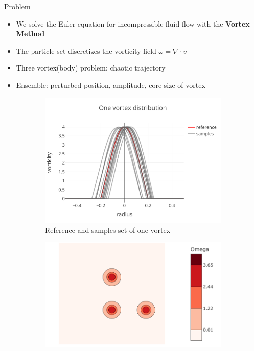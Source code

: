 \documentclass[aspectratio=169]{beamer} %
\begin{document}
\begin{frame}{Problem}
    \begin{itemize}
        \item We solve the Euler equation for incompressible fluid flow with the \textbf{Vortex Method}~\footnotemark[1]
        \item The particle set discretizes the vorticity field $\omega = \nabla \cdot v$
        \item Three vortex(body) problem: chaotic trajectory~\footnotemark[2]
        \item Ensemble: perturbed position, amplitude, core-size of vortex
    \end{itemize}

    \begin{figure}
        \begin{subfigure}[t]{0.32\textwidth}
            \centering
            \includegraphics[width=\textwidth]{images/vortex_distribution.pdf}
            \caption*{\tiny Reference and samples set of one vortex}
        \end{subfigure}
        \begin{subfigure}[t]{0.32\textwidth}
            \centering
            \includegraphics[width=\textwidth]{images/vorticity_field.png}

\end{subfigure}
\end{figure}
\end{frame}
\end{document}
